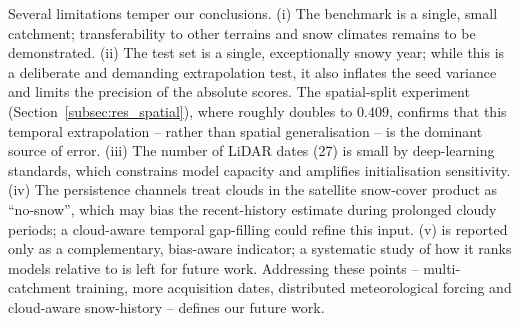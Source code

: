 Several limitations temper our conclusions. (i) The benchmark is a single,
small catchment; transferability to other terrains and snow climates remains to
be demonstrated. (ii) The test set is a single, exceptionally snowy year; while
this is a deliberate and demanding extrapolation test, it also inflates the
seed variance and limits the precision of the absolute scores. The spatial-split
experiment (Section~\ref{subsec:res_spatial}), where \Rsq{} roughly doubles to
$0.409$, confirms that this temporal extrapolation -- rather than spatial
generalisation -- is the dominant source of error. (iii) The number
of LiDAR dates (27) is small by deep-learning standards, which constrains model
capacity and amplifies initialisation sensitivity. (iv) The persistence
channels treat clouds in the satellite snow-cover product as ``no-snow'', which
may bias the recent-history estimate during prolonged cloudy periods; a
cloud-aware temporal gap-filling could refine this input. (v) \MSPAEF{} is
reported only as a complementary, bias-aware indicator; a systematic study of
how it ranks models relative to \SPAEF{} is left for future work. Addressing
these points -- multi-catchment training,
more acquisition dates, distributed meteorological forcing and cloud-aware
snow-history -- defines our future work.
